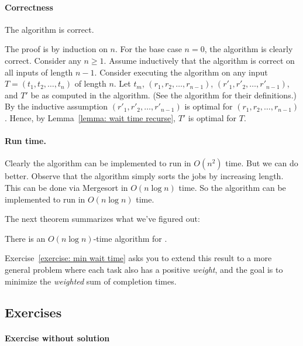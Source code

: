\paragraph{Correctness}
\begin{lemma} The algorithm is correct.
\end{lemma}
\begin{shortFormProof}
  The proof is by induction on $n$.
  For the base case $n=0$, the algorithm is clearly correct.
  Consider any $n\ge 1$.
  Assume inductively that the algorithm is correct on all inputs of length $n-1$.
  Consider executing the algorithm on any input $T=(t_1, t_2, \ldots, t_n)$ of length $n$.
  Let $t_m$, $(r_1, r_2, \ldots, r_{n-1})$, $(r'_1, r'_2, \ldots, r'_{n-1})$, 
  and $T'$ be as computed in the algorithm.
  (See the algorithm for their definitions.)
  By the inductive assumption $(r'_1, r'_2, \ldots, r'_{n-1})$ is optimal for $(r_1, r_2, \ldots, r_{n-1})$.
  Hence, by Lemma~\ref{lemma: wait time recurse}, $T'$ is optimal for $T$.
\end{shortFormProof}

\paragraph{Run time.}
Clearly the algorithm can be implemented to run in $O(n^2)$ time.
But we can do better.  Observe that the algorithm simply sorts the jobs
by increasing length.  This can be done via Mergesort in $O(n\log n)$ time.
So  the algorithm can be implemented to run in $O(n\log n)$ time.

The next theorem summarizes what we've figured out:
\begin{theorem}
  There is an $O(n\log n)$-time algorithm for .
\end{theorem}

Exercise~\ref{exercise: min wait time} %
asks you to extend this result to a more general
problem where each task also has a positive \emph{weight},
and the goal is to minimize the \emph{weighted} sum of completion times.

\subsection{Exercises}

\paragraph{Exercise without solution}

